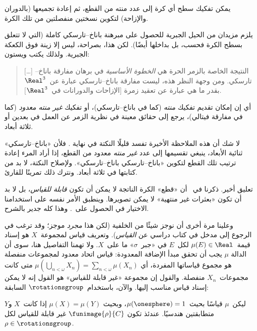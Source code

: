 \documentclass[../../../include/open-logic-section]{subfiles}
\begin{document}
\begin{thm}
يمكن تفكيك سطح أي كرة إلى عدد منته من القطع، ثم إعادة تجميعها
(بالدوران والإزاحة) لتكوين نسختين منفصلتين من تلك الكرة.
\end{thm}

يلزم مزيدان من الحيل الجبرية للحصول على مبرهنة باناخ--تارسكي كاملة
(التي لا تتعلق بسطح الكرة فحسب، بل بداخلها أيضًا). لكن هذا، بصراحة،
ليس إلا زينة فوق الكعكة الجبرية. ولذلك يكتب ويستون:
\begin{quote}	
  [\ldots] النتيجة الخاصة بالزمر الحرة هي \emph{الخطوة الأساسية} في
  برهان مفارقة باناخ--تارسكي. ومن وجهة النظر هذه، ليست مفارقة
  باناخ--تارسكي عبارة عن~$\Real^3$ بقدر ما هي عبارة عن تعقيد زمرة
  [الإزاحات والدورانات في~$\Real^3$]. \cite[p.~16]{Weston2003}
\end{quote}
أي إن إمكان تقديم تفكيك \emph{منته} (كما في باناخ--تارسكي)، أو تفكيك
\emph{غير منته معدود} (كما في مفارقة فيتالي)، يرجع إلى حقائق معينة
في نظرية الزمر عن العمل في بعدين أو ثلاثة أبعاد.

لا شك أن هذه الملاحظة الأخيرة تفسد قليلًا النكتة في نهاية
. فلأن «باناخ--تارسكي» ثنائية الأبعاد، ينبغي
تقسيمها إلى عدد \emph{غير منته} معدود من القطع، إذا أراد المرء إعادة
ترتيب تلك القطع لتكوين «باناخ--تارسكي باناخ--تارسكي». ولإصلاح
النكتة، لا بد من كتابتها في ثلاثة أبعاد. ونترك ذلك تمرينًا للقارئ.

تعليق أخير. ذكرنا في~ أن «قطع» الكرة الناتجة لا
يمكن أن تكون \emph{قابلة للقياس}، بل لا بد أن تكون «بعثرات غير
منتهية» لا يمكن تصويرها. وينطبق الأمر نفسه على استخدامنا الاختيار في
الحصول على~. وهذا كله جدير بالشرح.

وعلينا مرة أخرى أن نوجز شيئًا من الخلفية (لكن هذا \emph{مجرد} موجز؛
وقد ترغب في الرجوع إلى مدخل في كتاب دراسي عن \emph{القياس}). وتعريف
قياس لمجموعة~$X$ هو إسناد قيمة~$\mu(E) \in \Real$ لكل~$E$ في
«جبر~$\sigma$» ما على~$X$. ولا تهمنا التفاصيل هنا، سوى أن الدالة
$\mu$ يجب أن تحقق مبدأ الإضافة المعدودة: قياس اتحاد معدود لمجموعات
منفصلة هو مجموع قياساتها المفردة، أي
$\mu(\bigcup_{n < \omega} X_n) = \sum_{n < \omega}\mu(X_n)$ متى كانت
مجموعات~$X_n$ منفصلة. والقول إن مجموعة «غير قابلة للقياس» هو القول
إنه لا يمكن إسناد قياس مناسب إليها. والآن، باستخدام~$\rotationsgroup$
السابقة:

\begin{cor}[فيتالي]
ليكن~$\mu$ قياسًا بحيث~$\mu(\onesphere) = 1$، وبحيث
$\mu(X) = \mu(Y)$ إذا كانت~$X$ و$Y$ متطابقتين هندسيًا. عندئذ تكون
$\funimage{\rho}{C}$ غير قابلة للقياس لكل
$\rho \in \rotationsgroup$.
\end{cor}
\end{document}
